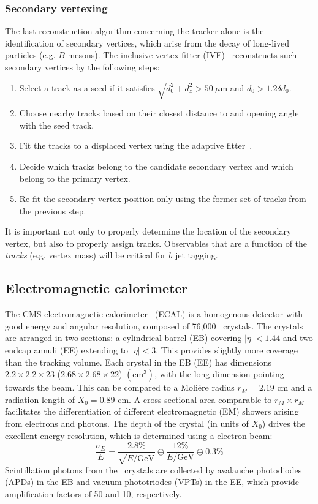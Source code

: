 \subsubsection{Secondary vertexing}

The last reconstruction algorithm concerning the tracker alone is the identification of secondary vertices, which arise from the decay of long-lived particles (e.g. $B$ mesons).
The inclusive vertex fitter (IVF)~\cite{csvv2} reconstructs such secondary vertices by the following steps:
\begin{enumerate}
	\item Select a track as a seed if it satisfies $\sqrt{d_0^2 + d_z^2} > 50~\mu\mathrm{m}$ and $d_0 > 1.2 \delta d_0$.
	\item Choose nearby tracks based on their closest distance to and opening angle with the seed track.
	\item Fit the tracks to a displaced vertex using the adaptive fitter~\cite{adaptivefit}.
	\item Decide which tracks belong to the candidate secondary vertex and which belong to the primary vertex.
	\item Re-fit the secondary vertex position only using the former set of tracks from the previous step.
\end{enumerate}
It is important not only to properly determine the location of the secondary vertex, but also to properly assign tracks.
Observables that are a function of the \emph{tracks} (e.g. vertex mass) will be critical for $b$ jet tagging.

\subsection{Electromagnetic calorimeter}

The CMS electromagnetic calorimeter~\cite{cmsecaljinst} (ECAL) is a homogenous detector with good energy and angular resolution, composed of 76,000 \pbwo~crystals. 
The crystals are arranged in two sections: a cylindrical barrel (EB) covering $|\eta|<1.44$ and two endcap annuli (EE) extending to $|\eta|<3$.
This provides slightly more coverage than the tracking volume.
Each crystal in the EB (EE) has dimensions $2.2\times2.2\times23$ ($2.68\times2.68\times22$) $(\mathrm{cm}^3)$, with the long dimension pointing towards the beam.
This can be compared to a Moli\'ere radius $r_M=2.19$ cm and a radiation length of $X_0=0.89$ cm. 
A cross-sectional area comparable to $r_M\times r_M$ facilitates the differentiation of different electromagnetic (EM) showers arising from electrons and photons.
The depth of the crystal (in units of $X_0$) drives the excellent energy resolution, which is determined using a electron beam:
\begin{equation}
    \frac{\sigma_E}{E} = \frac{2.8\%}{\sqrt{E/\mathrm{GeV}}} \oplus \frac{12\%}{E/\mathrm{GeV}} \oplus 0.3\%
\end{equation}
Scintillation photons from the \pbwo~crystals are collected by avalanche photodiodes (APDs) in the EB and vacuum phototriodes (VPTs) in the EE, which provide amplification factors of 50 and 10, respectively. 

